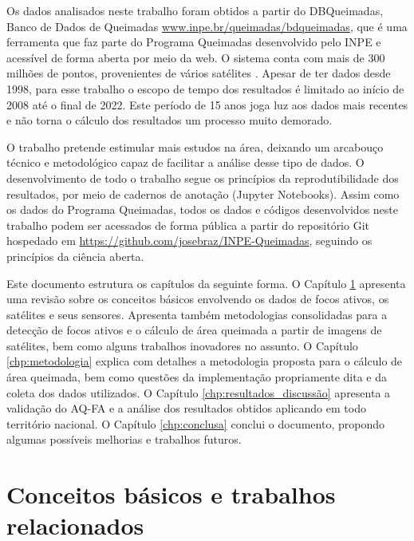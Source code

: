 \documentclass[cic,tc]{iiufrgs}
\begin{document}
Os dados analisados neste trabalho foram obtidos a partir do DBQueimadas, Banco de Dados de Queimadas \url{www.inpe.br/queimadas/bdqueimadas}, que é uma ferramenta que faz parte do Programa Queimadas desenvolvido pelo INPE e acessível de forma aberta por meio da web. O sistema conta com mais de 300 milhões de pontos, provenientes de vários satélites \citep{setzer2019banco}. Apesar de ter dados desde 1998, para esse trabalho o escopo de tempo dos resultados é limitado ao início de 2008 até o final de 2022. Este período de 15 anos joga luz aos dados mais recentes e não torna o cálculo dos resultados um processo muito demorado.


O trabalho pretende estimular mais estudos na área, deixando um arcabouço técnico e metodológico capaz de facilitar a análise desse tipo de dados. O desenvolvimento de todo o trabalho segue os princípios da reprodutibilidade dos resultados, por meio de cadernos de anotação (Jupyter Notebooks). Assim como os dados do Programa Queimadas, todos os dados e códigos desenvolvidos neste trabalho podem ser acessados de forma pública a partir do repositório Git hospedado em \url{https://github.com/josebraz/INPE-Queimadas}, seguindo os princípios da ciência aberta. 


Este documento estrutura os capítulos da seguinte forma. O Capítulo \ref{chp:conceitos_basicos} apresenta uma revisão sobre os conceitos básicos envolvendo os dados de focos ativos, os satélites e seus sensores. Apresenta também metodologias consolidadas para a detecção de focos ativos e o cálculo de área queimada a partir de imagens de satélites, bem como alguns trabalhos inovadores no assunto. O Capítulo \ref{chp:metodologia} explica com detalhes a metodologia proposta para o cálculo de área queimada, bem como questões da implementação propriamente dita e da coleta dos dados utilizados. O Capítulo \ref{chp:resultados_discussão} apresenta a validação do AQ-FA e a análise dos resultados obtidos aplicando em todo território nacional. O Capítulo \ref{chp:conclusa} conclui o documento, propondo algumas possíveis melhorias e trabalhos futuros.



\chapter{Conceitos básicos e trabalhos relacionados}
\label{chp:conceitos_basicos}
\end{document}
